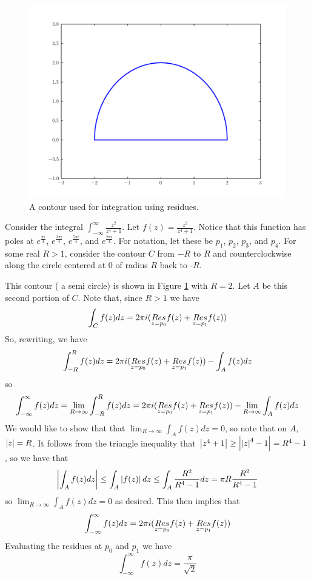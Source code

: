 \begin{figure}
\includegraphics[width=\textwidth]{contour1.pdf}
\caption{A contour used for integration using residues.}
\label{complexint:c1}
\end{figure}

Consider the integral $\int_{-\infty}^{\infty}\frac{z^2}{z^4+1}$. Let $f(z)=\frac{z^2}{z^4+1}$.
Notice that this function has poles at $e^{\frac{\pi i}{4}}$, $e^{\frac{3\pi i}{4}}$, $e^{\frac{5\pi i}{4}}$, and $e^{\frac{7\pi i}{4}}$.
For notation, let these be $p_1$, $p_2$, $p_3$, and $p_4$.
For some real $R>1$, consider the contour $C$ from $-R$ to $R$ and counterclockwise along the circle centered at $0$ of radius $R$ back to -$R$.

This contour ( a semi circle) is shown in Figure \ref{complexint:c1} with $R = 2$.
Let $A$ be this second portion of $C$.
Note that, since $R>1$ we have
\[\int_C f(z)dz = 2\pi i (\underset{z=p_0}{Res} f(z) +\underset{z=p_1}{Res} f(z))\]
So, rewriting, we have
\[\int_{-R}^R f(z) dz = 2\pi i (\underset{z=p_0}{Res} f(z) +\underset{z=p_1}{Res} f(z)) - \int_A f(z) dz\]
so
\[\int_{-\infty}^{\infty} f(z) dz = \lim_{R\to \infty} \int_{-R}^R f(z) dz = 2\pi i (\underset{z=p_0}{Res} f(z) +\underset{z=p_1}{Res} f(z)) - \lim_{R\to \infty} \int_A f(z) dz\]
We would like to show that that $\lim_{R\to\infty} \int_A f(z) dz = 0$, so note that on $A$, $\left\lvert z\right\rvert=R$.
It follows from the triangle inequality that $\left\lvert z^4+1\right\rvert\geq \left\lvert\left\lvert z\right\rvert^4-1\right\rvert = R^4 -1$, so we have that
\[\left\lvert\int_A f(z) dz\right\rvert\leq \int_A \left\lvert f(z)\right\rvert dz \leq \int_A \frac{R^2}{R^4 -1}dz = \pi R \frac{R^2}{R^4-1}\]
so $\lim_{R\to\infty} \int_A f(z) dz = 0$ as desired.
This then implies that
\[\int_{-\infty}^{\infty} f(z) dz = 2\pi i (\underset{z=p_0}{Res} f(z) +\underset{z=p_1}{Res} f(z))\]
Evaluating the residues at $p_0$ and $p_1$ we have
\[\int_{-\infty}^{\infty} f(z) dz = \frac{\pi}{\sqrt{2}}\]

